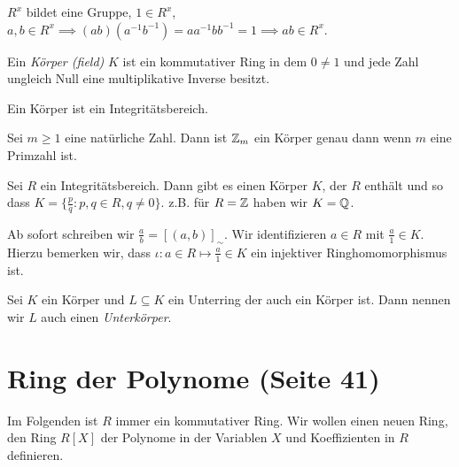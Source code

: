 \begin{remark}
	$R^{x}$ bildet eine Gruppe, $1 \in R^{x}$, $a,b \in R^{x} \implies (ab)(a^{-1} b^{-1}) = a a^{-1} b b^{-1} = 1 \implies a b \in R^{x}$.
\end{remark}


\begin{definition}
	Ein \emph{Körper (field)} $K$ ist ein kommutativer Ring in dem $0 \neq 1$ und jede Zahl ungleich Null eine multiplikative Inverse besitzt.
\end{definition}

\begin{lemma}
	Ein Körper ist ein Integritätsbereich.
\end{lemma}


\begin{proposition}
	Sei $m \geq 1$ eine natürliche Zahl.
	Dann ist $\mathbb{Z}_{m}$ ein Körper genau dann wenn $m$ eine Primzahl ist.
\end{proposition}


\begin{theorem}[Quotientenkörper (S.38)]
	Sei $R$ ein Integritätsbereich. Dann gibt es einen Körper $K$, der $R$ enthält und so dass $K = \{\frac{p}{q}: p,q \in R , q \neq 0\}$.
	z.B. für $R = \mathbb{Z}$ haben wir $K = \mathbb{Q}$.
\end{theorem}


	Ab sofort schreiben wir $\frac{a}{b} = [(a,b)]_{\sim}$.
	Wir identifizieren $a \in R$ mit $\frac{a}{1} \in K$. Hierzu bemerken wir, dass $\iota: a \in R \mapsto \frac{a}{1} \in K $ ein injektiver Ringhomomorphismus ist.


\begin{definition}
	Sei $K$ ein Körper und $L \subseteq K$ ein Unterring der auch ein Körper ist. Dann nennen wir $L$ auch einen \emph{Unterkörper}.
\end{definition}


\section{Ring der Polynome (Seite 41)}
Im Folgenden ist $R$ immer ein kommutativer Ring. Wir wollen einen neuen Ring, den Ring $R[X]$ der Polynome
in der Variablen $X$ und Koeffizienten in $R$ definieren.


